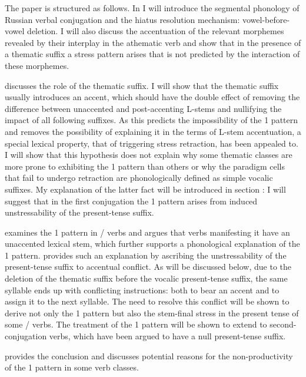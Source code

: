 \documentclass[output=paper,colorlinks,citecolor=black,koreanfont]{langscibook}
\begin{document}
The paper is structured as follows. In  I will introduce the segmental phonology of Russian verbal conjugation and the hiatus resolution mechanism: vowel-before-vowel deletion. I will also discuss the accentuation of the relevant morphemes revealed by their interplay in the athematic verb and show that in the presence of a thematic suffix a stress pattern arises that is not predicted by the interaction of these morphemes.

 discusses the role of the thematic suffix. I will show that the thematic suffix usually introduces an accent, which should have the double effect of removing the difference between unaccented and post-accenting L-stems and nullifying the impact of all following suffixes. As this predicts the impossibility of the {1\SG} pattern and removes the possibility of explaining it in the terms of L-stem accentuation, a special lexical property, that of triggering stress retraction, has been appealed to. I will show that this hypothesis does not explain why some thematic classes are more prone to exhibiting the {1\SG} pattern than others or why the paradigm cells that fail to undergo retraction are phonologically defined as simple vocalic suffixes. My explanation of the latter fact will be introduced in section : I will suggest that in the first conjugation the {1\SG} pattern arises from induced unstressability of the present-tense suffix.

 examines the {1\SG} pattern in / verbs and argues that verbs manifesting it have an unaccented lexical stem, which further supports a phonological explanation of the {1\SG} pattern.  provides such an explanation by ascribing the unstressability of the present-tense suffix to accentual conflict. As will be discussed below, due to the deletion of the thematic suffix before the vocalic present-tense suffix, the same syllable ends up with conflicting instructions: both to bear an accent and to assign it to the next syllable.  The need to resolve this conflict will be shown to derive not only the {1\SG} pattern but also the stem-final stress in the present tense of some / verbs. The treatment of the {1\SG} pattern will be shown to extend to second-conjugation verbs, which have 
been argued to have a null present-tense suffix. 

 provides the conclusion and discusses potential reasons for the non-pro\-duc\-tivity of the {1\SG} pattern in some verb classes.
\end{document}
